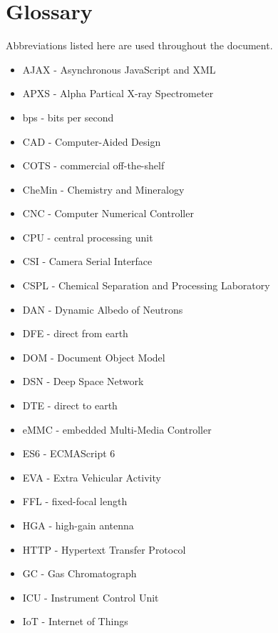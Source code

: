 \chapter*{Glossary}

Abbreviations listed here are used throughout the document.

\begin{itemize}
\item AJAX - Asynchronous JavaScript and XML
\item APXS - Alpha Partical X-ray Spectrometer

\item bps - bits per second

\item CAD - Computer-Aided Design
\item COTS - commercial off-the-shelf
\item CheMin - Chemistry and Mineralogy
\item CNC - Computer Numerical Controller
\item CPU - central processing unit
\item CSI - Camera Serial Interface
\item CSPL - Chemical Separation and Processing Laboratory

\item DAN - Dynamic Albedo of Neutrons
\item DFE - direct from earth
\item DOM - Document Object Model
\item DSN - Deep Space Network
\item DTE - direct to earth

\item eMMC - embedded Multi-Media Controller
\item ES6 - ECMAScript 6
\item EVA - Extra Vehicular Activity

\item FFL - fixed-focal length

\item HGA - high-gain antenna
\item HTTP - Hypertext Transfer Protocol

\item GC - Gas Chromatograph

\item ICU - Instrument Control Unit
\item IoT - Internet of Things


\end{itemize}
